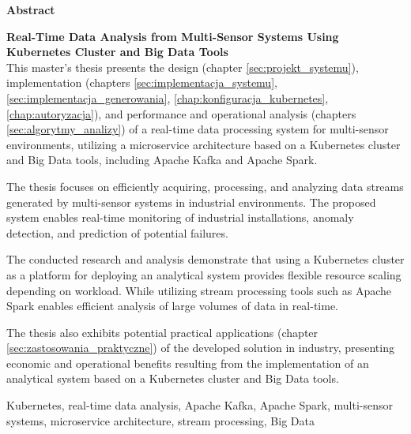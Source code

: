 \begin{abstract_en}
\begin{center}
\textbf{\large Abstract}
\end{center}
\vspace{0.5em}

 \textbf{Real-Time Data Analysis from Multi-Sensor Systems Using Kubernetes Cluster and Big Data Tools}\\

This master's thesis presents the design (chapter \ref{sec:projekt_systemu}), implementation (chapters \ref{sec:implementacja_systemu}, \ref{sec:implementacja_generowania}, \ref{chap:konfiguracja_kubernetes}, \ref{chap:autoryzacja}), and performance and operational analysis (chapters \ref{sec:algorytmy_analizy}) of a real-time data processing system for multi-sensor environments, utilizing a microservice architecture based on a Kubernetes cluster and Big Data tools, including Apache Kafka and Apache Spark.

The thesis focuses on efficiently acquiring, processing, and analyzing data streams generated by multi-sensor systems in industrial environments. The proposed system enables real-time monitoring of industrial installations, anomaly detection, and prediction of potential failures.

The conducted research and analysis demonstrate that using a Kubernetes cluster as a platform for deploying an analytical system provides flexible resource scaling depending on workload. While utilizing stream processing tools such as Apache Spark enables efficient analysis of large volumes of data in real-time.

The thesis also exhibits potential practical applications (chapter \ref{sec:zastosowania_praktyczne}) of the developed solution in industry, presenting economic and operational benefits resulting from the implementation of an analytical system based on a Kubernetes cluster and Big Data tools.

\begin{keywords_en}
Kubernetes, real-time data analysis, Apache Kafka, Apache Spark, multi-sensor systems, microservice architecture, stream processing, Big Data
\end{keywords_en}
\end{abstract_en}
